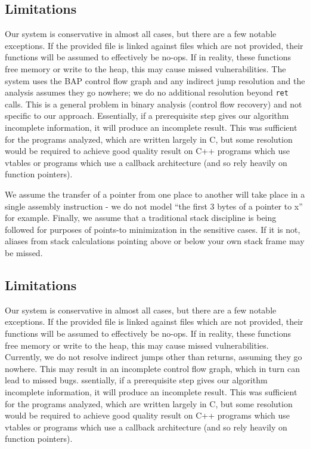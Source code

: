 \subsection{Limitations}
Our system is conservative in almost all cases, but there are a few notable exceptions.
If the provided file is linked against files which are not provided, their functions will be assumed to effectively be no-ops.
If in reality, these functions free memory or write to the heap, this may cause missed vulnerabilities.
The system uses the BAP control flow graph and any indirect jump
resolution and the analysis assumes they go nowhere; we do no additional resolution beyond \texttt{ret} calls.  %
This is a general problem in binary analysis (control flow recovery) and not specific to our approach.
Essentially, if a prerequisite step gives our algorithm incomplete information, it will produce an incomplete result.
This was sufficient for the programs analyzed, which are written largely in C, but some resolution would be required to achieve good quality result on C++ programs which use vtables or programs which use a callback architecture (and so rely heavily on function pointers).

We assume the transfer of a pointer from one place to another will take place in a single assembly instruction - we do not model ``the first 3 bytes of a pointer to x'' for example.
Finally, we assume that a traditional stack discipline is being followed for purposes of points-to minimization in the sensitive cases.
If it is not, aliases from stack calculations pointing above or below your own stack frame may be missed.


\subsection{Limitations}
Our system is conservative in almost all cases, but there are a few notable exceptions.
If the provided file is linked against files which are not provided, their functions will be assumed to effectively be no-ops.
If in reality, these functions free memory or write to the heap, this may cause missed vulnerabilities.
Currently, we do not resolve indirect jumps other than returns, assuming they go nowhere.
This may result in an incomplete control flow graph, which in turn can lead to missed bugs.
ssentially, if a prerequisite step gives our algorithm incomplete information, it will produce an incomplete result.
This was sufficient for the programs analyzed, which are written largely in C, but some resolution would be required to achieve good quality result on C++ programs which use vtables or programs which use a callback architecture (and so rely heavily on function pointers).

